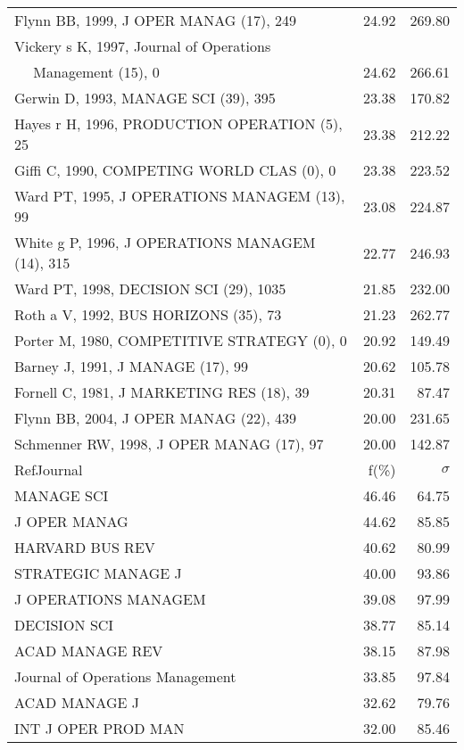 \documentclass[a4paper,11pt]{report}
\begin{document}
\begin{landscape}
\begin{table}[!ht]
{\begin{tabular}{|l r r|}
Flynn BB, 1999, J OPER MANAG (17), 249 & 24.92 & 269.80\\
Vickery s K, 1997, Journal of Operations &  & \\
$\quad$ Management (15), 0 & 24.62 & 266.61\\
Gerwin D, 1993, MANAGE SCI (39), 395 & 23.38 & 170.82\\
Hayes r H, 1996, PRODUCTION OPERATION (5), 25 & 23.38 & 212.22\\
Giffi C, 1990, COMPETING WORLD CLAS (0), 0 & 23.38 & 223.52\\
Ward PT, 1995, J OPERATIONS MANAGEM (13), 99 & 23.08 & 224.87\\
White g P, 1996, J OPERATIONS MANAGEM (14), 315 & 22.77 & 246.93\\
Ward PT, 1998, DECISION SCI (29), 1035 & 21.85 & 232.00\\
Roth a V, 1992, BUS HORIZONS (35), 73 & 21.23 & 262.77\\
Porter M, 1980, COMPETITIVE STRATEGY (0), 0 & 20.92 & 149.49\\
Barney J, 1991, J MANAGE (17), 99 & 20.62 & 105.78\\
Fornell C, 1981, J MARKETING RES (18), 39 & 20.31 & 87.47\\
Flynn BB, 2004, J OPER MANAG (22), 439 & 20.00 & 231.65\\
Schmenner RW, 1998, J OPER MANAG (17), 97 & 20.00 & 142.87\\
\hline
\hline
RefJournal & f(\%) & $\sigma$\\
\hline
MANAGE SCI & 46.46 & 64.75\\
J OPER MANAG & 44.62 & 85.85\\
HARVARD BUS REV & 40.62 & 80.99\\
STRATEGIC MANAGE J & 40.00 & 93.86\\
J OPERATIONS MANAGEM & 39.08 & 97.99\\
DECISION SCI & 38.77 & 85.14\\
ACAD MANAGE REV & 38.15 & 87.98\\
Journal of Operations Management & 33.85 & 97.84\\
ACAD MANAGE J & 32.62 & 79.76\\
INT J OPER PROD MAN & 32.00 & 85.46\\
\hline
\end{tabular}
}
\end{table}

\clearpage


\end{landscape}
\end{document}
